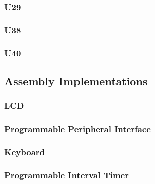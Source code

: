 \begin{appendices}
            \subsubsection{U29}


            \newpage
            \subsubsection{U38}


            \newpage
            \subsubsection{U40}


        \newpage
        \subsection{Assembly Implementations}

            \subsubsection{LCD} \label{sec:lcd_asm}

            \newpage
            \subsubsection{Programmable Peripheral Interface} \label{sec:ppi_asm}

            \newpage
            \subsubsection{Keyboard} \label{sec:keybrd_asm}

            \newpage
            \subsubsection{Programmable Interval Timer} \label{sec:pit_asm}

            \newpage

\end{appendices}
